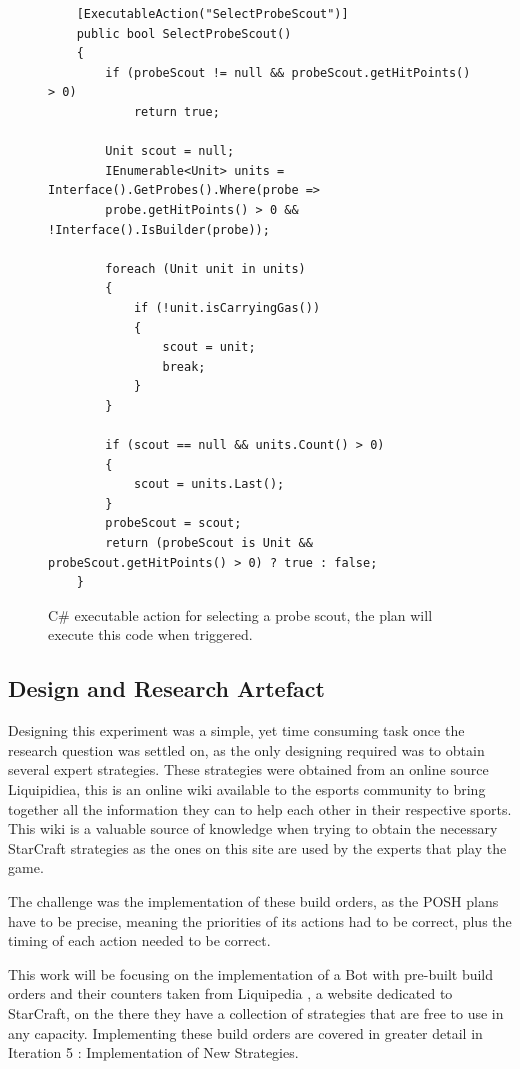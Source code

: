 \documentclass[journal]{IEEEtran}
\begin{document}
\begin{figure}
	\begin{lstlisting}
    [ExecutableAction("SelectProbeScout")]
    public bool SelectProbeScout()
    {
        if (probeScout != null && probeScout.getHitPoints() > 0)
            return true;

        Unit scout = null;
        IEnumerable<Unit> units = Interface().GetProbes().Where(probe =>
        probe.getHitPoints() > 0 && !Interface().IsBuilder(probe));

        foreach (Unit unit in units)
        {
            if (!unit.isCarryingGas())
            {
                scout = unit;
                break;
            }
        }
        
        if (scout == null && units.Count() > 0)
        {
            scout = units.Last();
        }
        probeScout = scout;
        return (probeScout is Unit && probeScout.getHitPoints() > 0) ? true : false;
    }
\end{lstlisting}
	\caption{C\# executable action for selecting a probe scout, the plan will execute this code when triggered.}
	\label{Fi4}
\end{figure}

\subsection{Design and Research Artefact}
Designing this experiment was a simple, yet time consuming task once the research question was settled on, as the only designing required was to obtain several expert strategies. These strategies were obtained from an online source Liquipidiea, this is an online wiki available to the esports community to bring together all the information they can to help each other in their respective sports. This wiki is a valuable source of knowledge when trying to obtain the necessary StarCraft strategies as the ones on this site are used by the experts that play the game. 

The challenge was the implementation of these build orders, as the POSH plans have to be precise, meaning the priorities of its actions had to be correct, plus the timing of each action needed to be correct. 

This work will be focusing on the implementation of a Bot with pre-built build orders and their counters taken from Liquipedia \cite{Liquid}, a website dedicated to StarCraft, on the there they have a collection of strategies that are free to use in any capacity. Implementing these build orders are covered in greater detail in Iteration 5 : Implementation of New Strategies.
\end{document}
